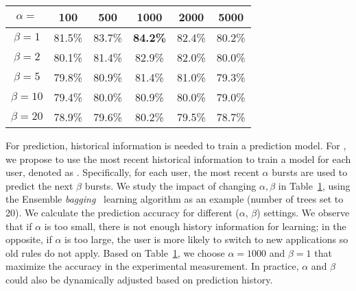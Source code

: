 
\begin{table}[t]
\begin{center}
\small
\begin{tabular}{|c|c|c|c|c|c|}\hline
$\alpha=$ & 100 & 500 & 1000 & 2000 & 5000\\\hline
$\beta=1$ & 81.5\% & 83.7\% & \textbf{84.2\%} & 82.4\% & 80.2\%\\\hline
$\beta=2$ & 80.1\% & 81.4\% & 82.9\% & 82.0\% & 80.0\%\\\hline
$\beta=5$ & 79.8\% & 80.9\% & 81.4\% & 81.0\% & 79.3\%\\\hline
$\beta=10$ & 79.4\% & 80.0\% & 80.9\% & 80.0\% & 79.0\%\\\hline
$\beta=20$ & 78.9\% & 79.6\% & 80.2\% & 79.5\% & 78.7\%\\\hline
\end{tabular}
\label{tab:alphabeta}
\end{center}
\end{table}

For \IBT prediction, historical \IBT information is needed to train a prediction model. For \NAME, we propose to use the most recent historical information to train a model for each user, denoted as \MostRecent. Specifically, for each user, the most recent $\alpha$ bursts are used to predict the next $\beta$ bursts. We study the impact of changing $\alpha, \beta$ in Table~\ref{tab:alphabeta}, using the Ensemble {\em bagging}~\cite{ensemble_bagging} learning algorithm as an example (number of trees set to 20). We calculate the prediction accuracy for different ($\alpha$, $\beta$) settings. We observe that if $\alpha$ is too small, there is not enough history information for learning; in the opposite, if $\alpha$ is too large, the user is more likely to switch to new applications so old rules do not apply. Based on Table~\ref{tab:alphabeta}, we choose $\alpha = 1000$ and $\beta = 1$ that maximize the accuracy in the experimental measurement. In practice, $\alpha$ and $\beta$ could also be dynamically adjusted based on prediction history.

